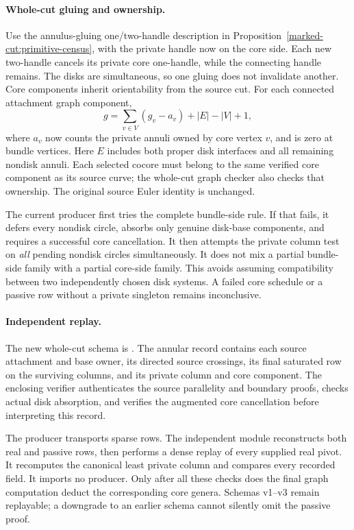 \paragraph{Whole-cut gluing and ownership.}
Use the annulus-gluing one/two-handle description in
Proposition~\ref{marked-cut:primitive-census}, with the private handle now on
the core side. Each new two-handle cancels its private core one-handle, while
the connecting handle remains. The disks are simultaneous, so one gluing
does not invalidate another. Core components inherit orientability from the
source cut. For each connected attachment graph component,
\[
 g=\sum_{v\in V}(g_v-a_v)+|E|-|V|+1,
\]
where $a_v$ now counts the private annuli owned by core vertex $v$, and is
zero at bundle vertices. Here $E$ includes both proper disk interfaces and
all remaining nondisk annuli. Each selected cocore must belong to the same
verified core component as its source curve; the whole-cut graph checker
also checks that ownership. The original source Euler identity is unchanged.

The current producer first tries the complete bundle-side rule. If that fails,
it defers every nondisk circle, absorbs only genuine disk-base components,
and requires a successful core cancellation. It then attempts the private
column test on \emph{all} pending nondisk circles simultaneously. It does not
mix a partial bundle-side family with a partial core-side family. This avoids
assuming compatibility between two independently chosen disk systems. A
failed core schedule or a passive row without a private singleton remains
inconclusive.

\paragraph{Independent replay.}
The new whole-cut schema is . The annular
record contains each source attachment and base owner, its directed source
crossings, its final saturated row on the surviving columns, and its private
column and core component. The enclosing verifier authenticates the source
parallelity and boundary proofs, checks actual disk absorption, and verifies
the augmented core cancellation before interpreting this record.

The producer transports sparse rows. The independent module
 reconstructs both real and passive rows,
then performs a dense replay of every supplied real pivot. It recomputes the
canonical least private column and compares every recorded field. It imports
no producer. Only after all these checks does the final graph computation
deduct the corresponding core genera. Schemas v1--v3 remain replayable;
a downgrade to an earlier schema cannot silently omit the passive proof.

